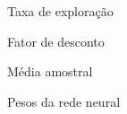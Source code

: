 \begin{simbolos} \itemsep -1pt
    \item[$ \epsilon $] Taxa de exploração
    \item[$ \gamma$] Fator de desconto
    \item[$ \mu$] Média amostral
    \item[$ \theta $] Pesos da rede neural
\end{simbolos}
